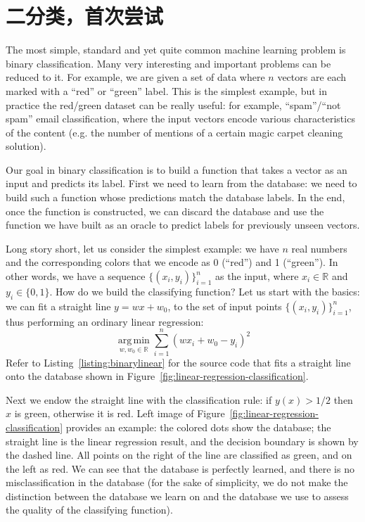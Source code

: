 \documentclass[notitlepage,oneside]{book}
\DeclareMathOperator*{\argmin}{arg\,min}
\begin{document}
\section{二分类，首次尝试}
\label{sec:binarylinear}
The most simple, standard and yet quite common machine learning problem is binary classification.
Many very interesting and important problems can be reduced to it.
For example, we are given a set of data where $n$ vectors are each marked with a ``red'' or ``green'' label.
This is the simplest example, but in practice the red/green dataset can be really useful: for example, ``spam''/``not spam'' email classification,
where the input vectors encode various characteristics of the content (e.g. the number of mentions of a certain magic carpet cleaning solution).

Our goal in binary classification is to build a function that takes a vector as an input and predicts its label.
First we need to learn from the database: we need to build such a function whose predictions match the database labels.
In the end, once the function is constructed, we can discard the database and use the function we have built as an oracle to predict labels for previously unseen vectors.

Long story short, let us consider the simplest example: we have $n$ real numbers and the corresponding colors that we encode as 0 (``red'') and 1 (``green'').
In other words, we have a sequence $\{(x_i, y_i)\}_{i=1}^n$ as the input, where $x_i\in\mathbb R$ and $y_i\in \{0,1\}$.
How do we build the classifying function? Let us start with the basics: we can fit a straight line $y=w x + w_0$,  to the set of input points $\{(x_i, y_i)\}_{i=1}^n$,
thus performing an ordinary linear regression:
$$
\argmin\limits_{w,w_0\in \mathbb R} \sum\limits_{i=1}^n (w x_i + w_0 - y_i)^2
$$
Refer to Listing~\ref{listing:binarylinear} for the source code that fits a straight line onto the database shown in Figure~\ref{fig:linear-regression-classification}.

Next we endow the straight line with the classification rule: if $y(x)>1/2$ then $x$ is green, otherwise it is red.
Left image of Figure~\ref{fig:linear-regression-classification} provides an example: the colored dots show the database; the straight line is the linear regression result,
and the decision boundary is shown by the dashed line. All points on the right of the line are classified as green, and on the left as red.
We can see that the database is perfectly learned, and there is no misclassification in the database
(for the sake of simplicity, we do not make the distinction between the database we learn on and the database we use to assess the quality of the classifying function).
\end{document}
